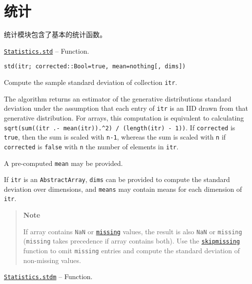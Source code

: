 \hypertarget{3919294208060022612}{}


\chapter{统计}





统计模块包含了基本的统计函数。


\hypertarget{1955374586742019663}{} 
\hyperlink{1955374586742019663}{\texttt{Statistics.std}}  -- {Function.}

\begin{adjustwidth}{2em}{0pt}


\begin{verbatim}
std(itr; corrected::Bool=true, mean=nothing[, dims])
\end{verbatim}

Compute the sample standard deviation of collection \texttt{itr}.

The algorithm returns an estimator of the generative distribution{\textquotesingle}s standard deviation under the assumption that each entry of \texttt{itr} is an IID drawn from that generative distribution. For arrays, this computation is equivalent to calculating \texttt{sqrt(sum((itr .- mean(itr)).{\textasciicircum}2) / (length(itr) - 1))}. If \texttt{corrected} is \texttt{true}, then the sum is scaled with \texttt{n-1}, whereas the sum is scaled with \texttt{n} if \texttt{corrected} is \texttt{false} with \texttt{n} the number of elements in \texttt{itr}.

A pre-computed \texttt{mean} may be provided.

If \texttt{itr} is an \texttt{AbstractArray}, \texttt{dims} can be provided to compute the standard deviation over dimensions, and \texttt{means} may contain means for each dimension of \texttt{itr}.

\begin{quote}
\textbf{Note}

If array contains \texttt{NaN} or \hyperlink{14596725676261444434}{\texttt{missing}} values, the result is also \texttt{NaN} or \texttt{missing} (\texttt{missing} takes precedence if array contains both). Use the \hyperlink{2012470681884771400}{\texttt{skipmissing}} function to omit \texttt{missing} entries and compute the standard deviation of non-missing values.

\end{quote}


\end{adjustwidth}
\hypertarget{11197607150486088950}{} 
\hyperlink{11197607150486088950}{\texttt{Statistics.stdm}}  -- {Function.}

